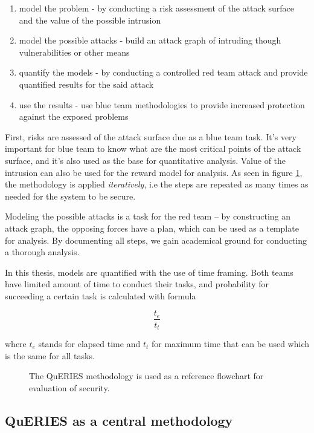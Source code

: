 \begin{enumerate}
  \item model the problem - by conducting a risk assessment of the
    attack surface and the value of the possible intrusion
  \item model the possible attacks - build an attack graph of
    intruding though vulnerabilities or other means
  \item quantify the models - by conducting a controlled red team
    attack and provide quantified results for the said attack
  \item use the results - use blue team methodologies to provide
    increased protection against the exposed problems
  
\end{enumerate}

First, risks are assessed of the attack surface due as a blue team
task. It's very important for blue team to know what are the most
critical points of the attack surface, and it's also used as the base
for quantitative analysis. Value of the intrusion can also be used for
the reward model for analysis. As seen in figure \ref{queries}, the
methodology is applied \textit{iteratively}, i.e the steps are
repeated as many times as needed for the system to be secure.

Modeling the possible attacks is a task for the red team – by
constructing an attack graph, the opposing forces have a plan, which
can be used as a template for analysis. By documenting all steps, we
gain academical ground for conducting a thorough analysis.

In this thesis, models are quantified with the use of time
framing. Both teams have limited amount of time to conduct their
tasks, and probability for succeeding a certain task is calculated
with formula

\[ \frac{t_e}{t_t} \]

where \(t_e\) stands for elapsed time and \(t_t\) for maximum time
that can be used which is the same for all tasks.

\begin{figure}[t!]
\centerline{}
\caption{The QuERIES methodology is used as a reference flowchart for
  evaluation of security. \cite{hughes2013quantitative}}
\label{queries}
\end{figure}
\subsection{QuERIES as a central methodology}

